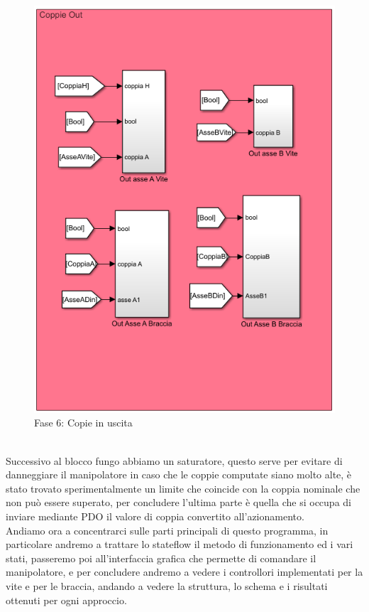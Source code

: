 \begin{figure}[ht]
	\begin{center}
		\includegraphics[scale=0.6]{Immagini/Sperimentale/CoppieOut}
		\caption{Fase 6: Copie in uscita
			\label{fig:Coppieout}}
	\end{center}
\end{figure}
\\Successivo al blocco fungo abbiamo un saturatore, questo serve per evitare di danneggiare il manipolatore in caso che le coppie computate siano molto alte, è stato trovato sperimentalmente un limite che coincide con la coppia nominale che non può essere superato, per concludere l'ultima parte è quella che si occupa di inviare mediante PDO il valore di coppia convertito all'azionamento.
\\Andiamo ora a concentrarci sulle parti principali di questo programma, in particolare andremo a trattare lo stateflow il metodo di funzionamento ed i vari stati, passeremo poi all'interfaccia grafica che permette di comandare il manipolatore, e per concludere andremo a vedere i controllori implementati per la vite e per le braccia, andando a vedere la struttura, lo schema e i risultati ottenuti per ogni approccio.

